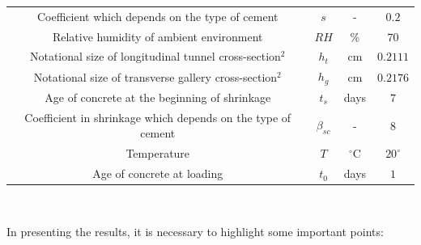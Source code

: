 \documentclass[a4paper,fleqn]{cas-sc}
\begin{document}
\begin{table}
\begin{tabular}{c c c c}
		Coefficient which depends on the type of cement & $s$ & - & $0.2$ \\
		Relative humidity of ambient environment & $RH$ & \% & $70$ \\
		Notational size of longitudinal tunnel cross-section$^2$ & $h_t$ & cm & $0.2111$ \\
		Notational size of transverse gallery cross-section$^2$ & $h_{g}$ & cm & $0.2176$ \\
		Age of concrete at the beginning of shrinkage & $t_s$ & days & $7$ \\
		Coefficient in shrinkage which depends on the type of cement & $\beta_{sc}$ & - & $8$ \\
		Temperature & $T$ & $^\circ$C & $20^\circ$ \\
		Age of concrete at loading & $t_0$ & days & $1$ \\
		\hline
	\end{tabular}
	\normalsize
	\\ 
\end{table}
\FloatBarrier
In presenting the results, it is necessary to highlight some important points:
\end{document}
